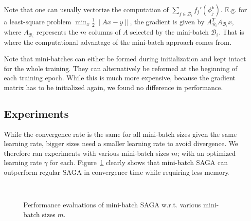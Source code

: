 \documentclass[a4paper,10pt]{article}
\newcommand{\B}{\mathcal{B}}
\newcommand{\figref}[1]{Figure~\ref{fig:#1}}
\begin{document}
Note that one can usually vectorize the computation of $\sum_{j\in\B_i}
f_j'(\phi_j^k)$. E.g. for a least-square problem $\min_x \frac12 \|Ax - y\|$,
the gradient is given by $A_{\B_i}^T A_{\B_i} x$, where $A_{\B_i}$ represents
the $m$ columns of $A$ selected by the mini-batch $\B_i$. That is where the
computational advantage of the mini-batch approach comes from.

Note that mini-batches can either be formed during initialization and kept
intact for the whole training. They can alternatively be reformed at the
beginning of each training epoch. While this is much more expensive, because the
gradient matrix has to be initialized again, we found no difference in
performance.

\subsection{Experiments}

While the convergence rate is the same for all mini-batch sizes given the same
learning rate, bigger sizes need a smaller learning rate to avoid divergence.
We therefore ran experiments with various mini-batch sizes $m$; with an
optimized learning rate $\gamma$ for each. \figref{eval_saga_mb} clearly shows
that mini-batch SAGA can outperform regular SAGA in convergence time while
requiring less memory.

\begin{figure}[ht]
	\centering
	\hspace{0pt}
	\\
	\caption{Performance evaluations of mini-batch SAGA w.r.t. various
	mini-batch sizes $m$.}
	\label{fig:eval_saga_mb}
\end{figure}
\end{document}
